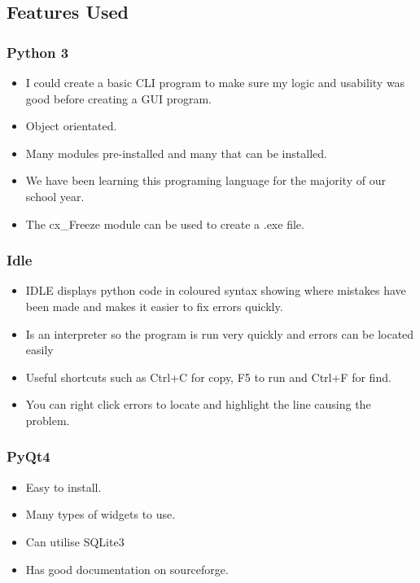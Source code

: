 \subsection{Features Used}

\subsubsection{Python 3}

\begin{itemize}
	\item I could create a basic CLI program to make sure my logic and usability was good before creating a GUI program. 
	\item Object orientated.
	\item Many modules pre-installed and many that can be installed.
	\item We have been learning this programing language for the majority of our school year.
	\item The cx\_Freeze module can be used to create a .exe file.
\end{itemize}

\subsubsection{Idle}

\begin{itemize}
	\item IDLE displays python code in coloured syntax showing where mistakes have been made and makes it easier to fix errors quickly.
	\item Is an interpreter so the program is run very quickly and errors can be located easily 
	\item Useful shortcuts such as Ctrl+C for copy, F5 to run and Ctrl+F for find.
	\item You can right click errors to locate and highlight the line causing the problem.
\end{itemize}

\subsubsection{PyQt4}

\begin{itemize}
	\item Easy to install.
	\item Many types of widgets to use.
	\item Can utilise SQLite3
	\item Has good documentation on sourceforge.
\end{itemize}

